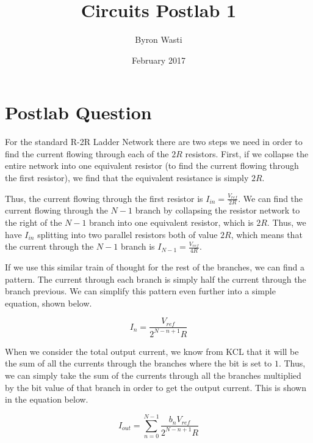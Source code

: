 \documentclass{article}
\title{Circuits Postlab 1}
\author{Byron Wasti}
\date{February 2017}
\begin{document}
\maketitle

\section{Postlab Question}

For the standard R-2R Ladder Network there are two steps we need in order to find the current flowing through each of the $2R$ resistors. First, if we collapse the entire network into one equivalent resistor (to find the current flowing through the first resistor), we find that the equivalent resistance is simply $2R$.

Thus, the current flowing through the first resistor is $I_{in} = \frac{V_{ref}}{2R}$. We can find the current flowing through the $N-1$ branch by collapsing the resistor network to the right of the $N-1$ branch into one equivalent resistor, which is $2R$. Thus, we have $I_{in}$ splitting into two parallel resistors both of value $2R$, which means that the current through the $N-1$ branch is $I_{N-1} = \frac{V_{ref}}{4R}$.

If we use this similar train of thought for the rest of the branches, we can find a pattern. The current through each branch is simply half the current through the branch previous. We can simplify this pattern even further into a simple equation, shown below.

\begin{equation}
    I_{n} = \frac{V_{ref}}{2^{N-n+1}R}
\end{equation}

When we consider the total output current, we know from KCL that it will be the sum of all the currents through the branches where the bit is set to $1$. Thus, we can simply take the sum of the currents through all the branches multiplied by the bit value of that branch in order to get the output current. This is shown in the equation below.

\begin{equation}
    I_{out} = \sum_{n=0}^{N-1} \frac{b_nV_{ref}}{2^{N-n+1}R}
\end{equation}
\end{document}
